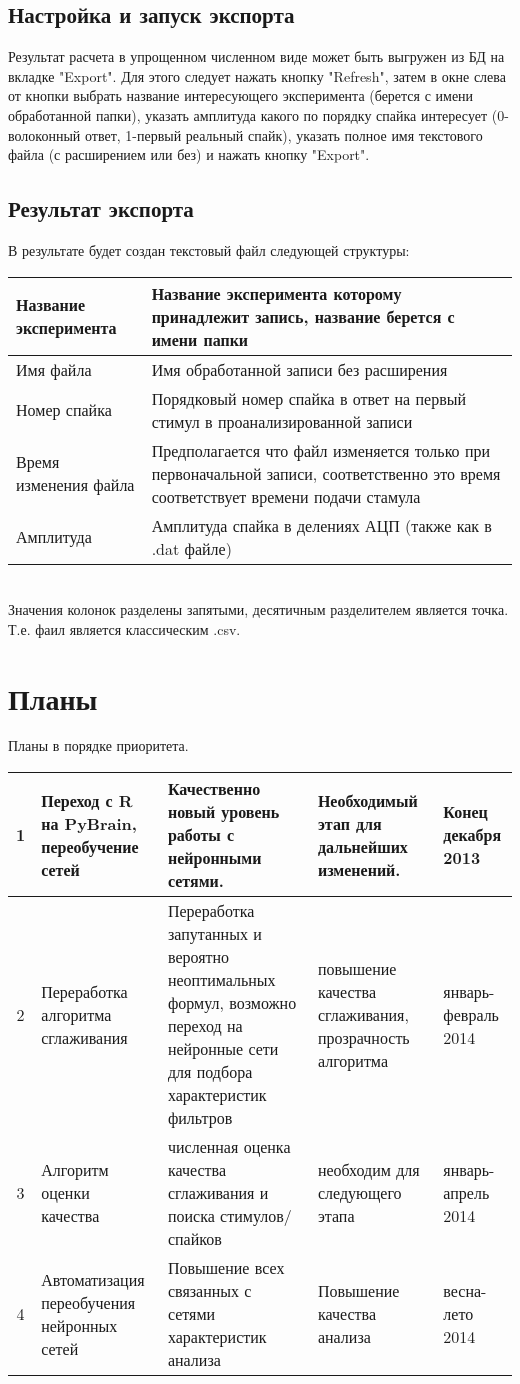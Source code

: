 \documentclass[12pt,a4paper]{report}
\begin{document}
\section{Настройка и запуск экспорта}
Результат расчета в упрощенном численном виде может быть выгружен из БД на вкладке "Export". Для этого следует нажать кнопку "Refresh", затем в окне слева от кнопки выбрать название интересующего эксперимента (берется с имени обработанной папки), указать амплитуда какого по порядку спайка интересует (0-волоконный ответ, 1-первый реальный спайк), указать полное имя текстового файла (с расширением или без) и нажать кнопку "Export".
\section{Результат экспорта}
В результате будет создан текстовый файл следующей структуры:\\
\begin{tabular}{|p{4.5cm}|p{12cm}|}
\hline 
Название эксперимента & Название эксперимента которому принадлежит запись, название берется с имени папки \\ 
\hline 
Имя файла & Имя обработанной записи без расширения \\ 
\hline 
Номер спайка & Порядковый номер спайка в ответ на первый стимул в проанализированной записи \\ 
\hline 
Время изменения файла & Предполагается что файл изменяется только при первоначальной записи, соответственно это время соответствует времени подачи стамула \\ 
\hline 
Амплитуда & Амплитуда спайка в делениях АЦП (также как в .dat файле) \\ 
\hline 
\end{tabular}
\\ 
Значения колонок разделены запятыми, десятичным разделителем является точка. Т.е. фаил является классическим .csv.
\chapter{Планы}
Планы в порядке приоритета.\\
\begin{tabular}{|c|p{3cm}|p{6cm}|p{4cm}|p{2cm}|}
\hline 
1 & Переход с R на PyBrain, переобучение сетей &  Качественно новый уровень работы с нейронными сетями. & Необходимый этап для дальнейших изменений. & Конец декабря 2013 \\ 
\hline 
2 & Переработка алгоритма сглаживания & Переработка запутанных и вероятно неоптимальных формул, возможно переход на нейронные сети для подбора характеристик фильтров & повышение качества сглаживания, прозрачность алгоритма & январь-февраль 2014 \\ 
\hline 
3 & Алгоритм оценки качества & численная оценка качества сглаживания и поиска стимулов/спайков & необходим для следующего этапа & январь-апрель 2014 \\ 
\hline 
4 & Автоматизация переобучения нейронных сетей & Повышение всех связанных с сетями характеристик анализа & Повышение качества анализа & весна-лето 2014 \\ 
\hline 
\end{tabular} 
\end{document}
